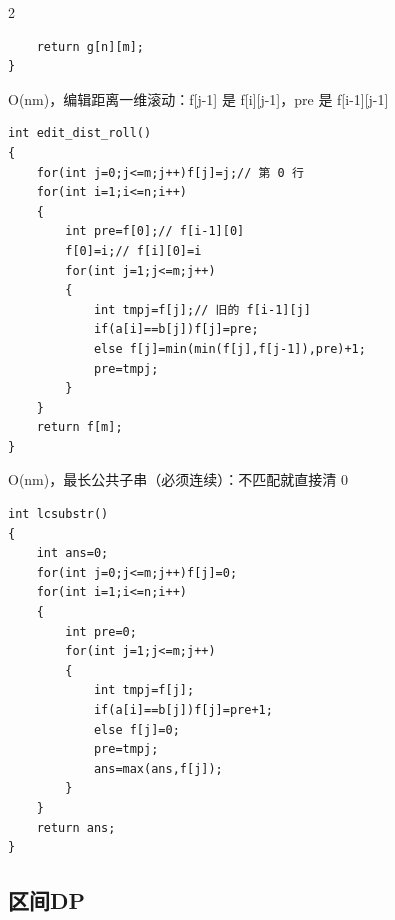 \documentclass[UTF8,fontset=fandol,a4paper,twoside]{ctexart}
\newcommand{\note}[1]{{\fontsize{10}{12}\selectfont #1\par}}
\begin{document}
\begin{multicols}{2}
\begin{lstlisting}
    return g[n][m];
}
\end{lstlisting}
\note{O(\allowbreak{}nm)\allowbreak{}，编辑距离一维滚动：f[\allowbreak{}j-\allowbreak{}1]\allowbreak{} 是 f[\allowbreak{}i]\allowbreak{}[\allowbreak{}j-\allowbreak{}1]\allowbreak{}，pre 是 f[\allowbreak{}i-\allowbreak{}1]\allowbreak{}[\allowbreak{}j-\allowbreak{}1]\allowbreak{}}
\begin{lstlisting}
int edit_dist_roll()
{
    for(int j=0;j<=m;j++)f[j]=j;// 第 0 行
    for(int i=1;i<=n;i++)
    {
        int pre=f[0];// f[i-1][0]
        f[0]=i;// f[i][0]=i
        for(int j=1;j<=m;j++)
        {
            int tmpj=f[j];// 旧的 f[i-1][j]
            if(a[i]==b[j])f[j]=pre;
            else f[j]=min(min(f[j],f[j-1]),pre)+1;
            pre=tmpj;
        }
    }
    return f[m];
}
\end{lstlisting}
\note{O(\allowbreak{}nm)\allowbreak{}，最长公共子串（必须连续）：不匹配就直接清 0}
\begin{lstlisting}
int lcsubstr()
{
    int ans=0;
    for(int j=0;j<=m;j++)f[j]=0;
    for(int i=1;i<=n;i++)
    {
        int pre=0;
        for(int j=1;j<=m;j++)
        {
            int tmpj=f[j];
            if(a[i]==b[j])f[j]=pre+1;
            else f[j]=0;
            pre=tmpj;
            ans=max(ans,f[j]);
        }
    }
    return ans;
}
\end{lstlisting}
\subsection{区间DP}


\end{multicols}
\end{document}

